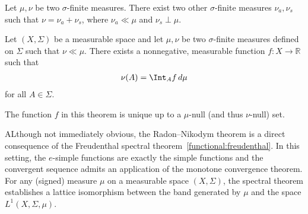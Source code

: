     \begin{theorem}
        Let $\mu,\nu$ be two $\sigma$-finite measures. There exist two other $\sigma$-finite measures $\nu_a,\nu_s$ such that $\nu=\nu_a+\nu_s$, where $\nu_a\ll\mu$ and $\nu_s\perp\mu$.
    \end{theorem}


    \begin{theorem}\label{measure:radon_nikodym}
        Let $(X,\Sigma)$ be a measurable space and let $\mu,\nu$ be two $\sigma$-finite measures defined on $\Sigma$ such that $\nu\ll\mu$. There exists a nonnegative, measurable function $f:X\rightarrow\mathbb{R}$ such that
        \begin{gather}
            \nu(A) = \Int_Af\,d\mu
        \end{gather}
        for all $A\in\Sigma$.
    \end{theorem}

    \begin{remark}
        The function $f$ in this theorem is unique up to a $\mu$-null (and thus $\nu$-null) set.
    \end{remark}

    \begin{remark}[Freudenthal]
        ALthough not immediately obvious, the Radon--Nikodym theorem is a direct consequence of the Freudenthal spectral theorem~\ref{functional:freudenthal}. In this setting, the $e$-simple functions are exactly the simple functions and the convergent sequence admits an application of the monotone convergence theorem. For any (signed) measure $\mu$ on a measurable space $(X,\Sigma)$, the spectral theorem establishes a lattice isomorphism between the band generated by $\mu$ and the space $L^1(X,\Sigma,\mu)$.
    \end{remark}

